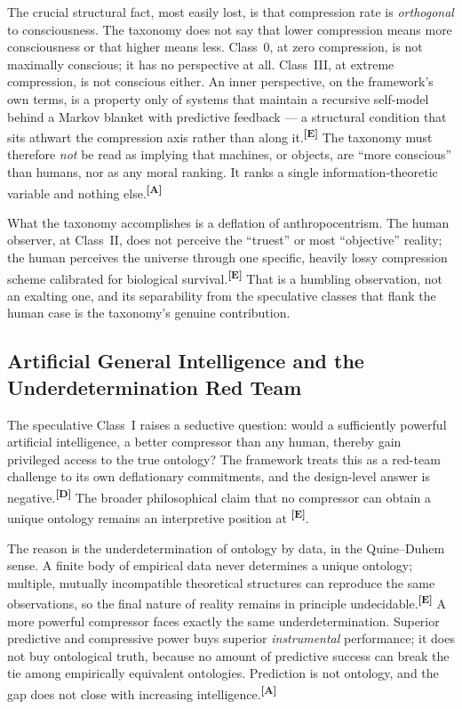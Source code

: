 \documentclass[12pt,a4paper,twoside]{article}
\theoremstyle{plain}
\theoremstyle{definition}
\theoremstyle{remark}
\newcommand{\catmark}[1]{\textsuperscript{\textsf{\textbf{[#1]}}}}
\begin{document}
The crucial structural fact, most easily lost, is that compression rate is
\emph{orthogonal} to consciousness. The taxonomy does not say that lower
compression means more consciousness or that higher means less. Class~0, at
zero compression, is not maximally conscious; it has no perspective at all.
Class~III, at extreme compression, is not conscious either. An inner
perspective, on the framework's own terms, is a property only of systems
that maintain a recursive self-model behind a Markov blanket with
predictive feedback --- a structural condition that sits athwart the
compression axis rather than along it.\catmark{E} The taxonomy must
therefore \emph{not} be read as implying that machines, or objects, are
``more conscious'' than humans, nor as any moral ranking. It ranks a single
information-theoretic variable and nothing else.\catmark{A}

What the taxonomy accomplishes is a deflation of anthropocentrism. The
human observer, at Class~II, does not perceive the ``truest'' or most
``objective'' reality; the human perceives the universe through one
specific, heavily lossy compression scheme calibrated for biological
survival.\catmark{E} That is a humbling observation, not an exalting one,
and its separability from the speculative classes that flank the human case
is the taxonomy's genuine contribution.

\subsection{Artificial General Intelligence and the Underdetermination Red Team}
\label{subsec:agi-underdetermination}

The speculative Class~I raises a seductive question: would a sufficiently
powerful artificial intelligence, a better compressor than any human,
thereby gain privileged access to the true ontology? The framework treats
this as a red-team challenge to its own deflationary commitments, and the
design-level answer is negative.\catmark{D} The broader philosophical
claim that no compressor can obtain a unique ontology remains an
interpretive position at \catmark{E}.

The reason is the underdetermination of ontology by data, in the
Quine--Duhem sense. A finite body of empirical data never determines a
unique ontology; multiple, mutually incompatible theoretical structures can
reproduce the same observations, so the final nature of reality remains in
principle undecidable.\catmark{E} A more powerful compressor faces exactly
the same underdetermination. Superior predictive and compressive power buys
superior \emph{instrumental} performance; it does not buy ontological
truth, because no amount of predictive success can break the tie among
empirically equivalent ontologies. Prediction is not ontology, and the gap
does not close with increasing intelligence.\catmark{A}
\end{document}
